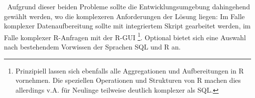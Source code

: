 ~\newline Aufgrund dieser beiden Probleme sollte die Entwicklungsumgebung dahingehend gewählt werden, wo die komplexeren Anforderungen der Lösung liegen: Im Falle komplexer Datenaufbereitung sollte mit integriertem Skript gearbeitet werden, im Falle komplexer R-Anfragen mit der R-GUI \footnote{Prinzipiell lassen sich ebenfalls alle Aggregationen und Aufbereitungen in R vornehmen. Die speziellen Operationen und Strukturen von R machen dies allerdings v.A. für Neulinge teilweise deutlich komplexer als SQL.}.  Optional bietet sich eine Auswahl nach bestehendem Vorwissen der Sprachen SQL und R an. 
